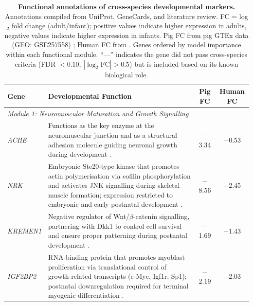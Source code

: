 \begin{landscape}
\begin{table}[p]
  \singlespacing
  \centering
  \caption{\textbf{Functional annotations of cross-species developmental markers.} Annotations compiled from UniProt, GeneCards, and literature review. FC = log$_2$ fold change (adult/infant); positive values indicate higher expression in adults, negative values indicate higher expression in infants. Pig FC from pig GTEx data (GEO: GSE257558) \parencite{teng_compendium_2024}; Human FC from \textcite{schaiter_molecular_2024}. Genes ordered by model importance within each functional module. ``---'' indicates the gene did not pass cross-species criteria (FDR $< 0.10$, $|\log_2\text{FC}| > 0.5$) but is included based on its known biological role.}
  \label{tab:S3}
  \scriptsize
  \setlength{\tabcolsep}{4pt}
  \renewcommand{\arraystretch}{0.95}
  \begin{tabularx}{\linewidth}{lXcc}
    \toprule
    Gene & Developmental Function & Pig FC & Human FC \\
    \midrule
    \multicolumn{4}{l}{\textit{Module 1: Neuromuscular Maturation and Growth Signalling}} \\
    \textit{ACHE} & Functions as the key enzyme at the neuromuscular junction and as a structural adhesion molecule guiding neuronal growth during development \parencite{rotundo_expression_2003}. & $-$3.34 & $-$0.53 \\

    \textit{NRK} & Embryonic Ste20-type kinase that promotes actin polymerisation via cofilin phosphorylation and activates JNK signalling during skeletal muscle formation; expression restricted to embryonic and early postnatal development \parencite{kanai-azuma_nrk_1999}. & $-$8.56 & $-$2.45 \\

    \textit{KREMEN1} & Negative regulator of Wnt/$\beta$-catenin signalling, partnering with Dkk1 to control cell survival and ensure proper patterning during postnatal development \parencite{osada_wnt_2006, qin_canonical_2024}. & $-$1.69 & $-$1.43 \\

    \textit{IGF2BP2} & RNA-binding protein that promotes myoblast proliferation via translational control of growth-related transcripts (c-Myc, Igf1r, Sp1); postnatal downregulation required for terminal myogenic differentiation \parencite{li_hmga2-igf2bp2_2012}. & $-$2.19 & $-$2.03 \\


\end{tabularx}
\end{table}
\end{landscape}
